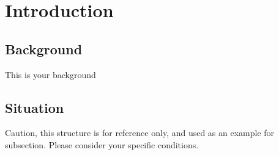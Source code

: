 \section{Introduction}
\subsection{Background}
This is your background
\subsection{Situation}
Caution, this structure is for reference only, and used as an example for subsection. Please consider your specific conditions.